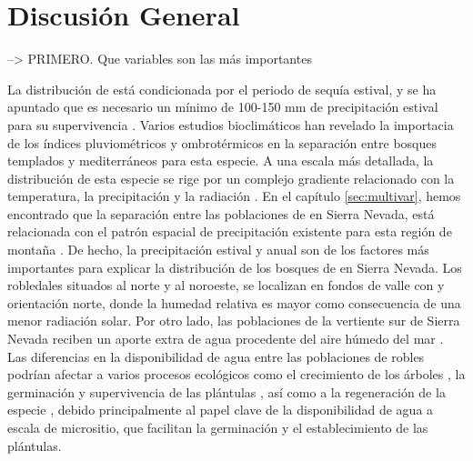 %
\chapter*{\textcolor{ctcolormain}{Discusión General}}\label{sec:intro}
\newpage


--> PRIMERO. Que variables son las más importantes

La distribución de \Qp está condicionada por el periodo de sequía estival, y se ha apuntado que es necesario un mínimo de 100-150 mm de precipitación estival para su supervivencia \autocite{BlancoCastroetal2005BosquesIbericos,GarciaJimenez20099230Robledales}. Varios estudios bioclimáticos han revelado la importacia de los índices pluviométricos y ombrotérmicos en la separación entre bosques templados y mediterráneos \autocite{delRioetal2007BioclimaticAnalysis} para esta especie. A una escala más detallada, la distribución de esta especie se rige por un complejo gradiente relacionado con la temperatura, la precipitación y la radiación \autocite{Gavilanetal2007ModellingCurrent,Urbietaetal2011MediterraneanPine}. En el capítulo \ref{sec:multivar}, hemos encontrado que la separación entre las poblaciones de \Qp en Sierra Nevada, está  relacionada con el patrón espacial de precipitación existente para esta región de montaña \autocite{Pereiraetal2016SpatialInterpolation}. De hecho, la precipitación estival y anual son de los factores más importantes para explicar la distribución de los bosques de \Qp en Sierra Nevada. Los robledales situados al norte y al noroeste, se localizan en fondos de valle con y orientación norte, donde la humedad relativa es mayor como consecuencia de una menor radiación solar. Por otro lado, las poblaciones de la vertiente sur de Sierra Nevada reciben un aporte extra de agua procedente del aire húmedo del mar \autocite{MartinezParrasMoleroMesa1982EcologiaFitosociologia}. Las diferencias en la disponibilidad de agua entre las poblaciones de robles podrían afectar a varios procesos ecológicos como el crecimiento de los árboles \autocites[ver capítulo \ref{sec:dendro} ][]{GeaIzquierdoCanellas2014LocalClimate,PerezLuqueetal2020LanduseLegacies}, la germinación y supervivencia de las plántulas \autocites{Gomez2003ImpactVertebrate, GomezAparicioetal2008OakSeedling,Mendozaetal2009SeedingExperiment}, así como a la regeneración de la especie \autocites{Gomezetal2001ProblemasRegeneracion}, debido principalmente al papel clave de la disponibilidad de agua a escala de micrositio, que facilitan la germinación y el establecimiento de las plántulas.

